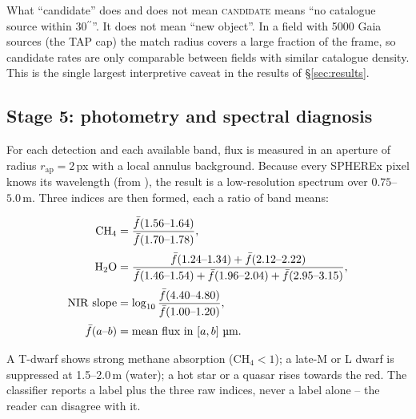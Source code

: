 \documentclass[11pt,a4paper]{article}
\newcommand{\arcsec}{\ensuremath{{}^{\prime\prime}}}
\newcommand{\code}[1]{\texttt{\small\detokenize{#1}}}
\begin{document}
\begin{warnbox}{What ``candidate'' does and does not mean}
\textsc{candidate} means ``no catalogue source within $30\arcsec$''. It does not mean ``new object''.
In a field with 5000 Gaia sources (the TAP cap) the match radius covers a large fraction of the frame,
so candidate rates are only comparable between fields with similar catalogue density. This is the
single largest interpretive caveat in the results of \S\ref{sec:results}.
\end{warnbox}

\subsection{Stage 5: photometry and spectral diagnosis}
\label{sec:spectrum}

For each detection and each available band, flux is measured in an aperture of radius
$r_{\mathrm{ap}} = 2$\,px with a local annulus background. Because every SPHEREx pixel knows its
wavelength (from \code{WCS-WAVE}), the result is a low-resolution spectrum over
$0.75$--$5.0$\,\textmu m. Three indices are then formed, each a ratio of band means:

\begin{align}
  \mathrm{CH_4} &= \frac{\bar f(1.56\text{--}1.64)} {\bar f(1.70\text{--}1.78)},
  \label{eq:ch4}\\[2pt]
  \mathrm{H_2O} &= \frac{\bar f(1.24\text{--}1.34)+\bar f(2.12\text{--}2.22)}
                          {\bar f(1.46\text{--}1.54)+\bar f(1.96\text{--}2.04)+\bar f(2.95\text{--}3.15)},
  \label{eq:h2o}\\[2pt]
  \mathrm{NIR\ slope} &= \log_{10}\frac{\bar f(4.40\text{--}4.80)}{\bar f(1.00\text{--}1.20)},
  \label{eq:slope}\\[2pt]
  \bar f(a\text{--}b) &= \text{mean flux in } [a,b]\ \text{\textmu m}.
  \label{eq:meanflux}
\end{align}

A T-dwarf shows strong methane absorption ($\mathrm{CH_4} < 1$); a late-M or L dwarf is suppressed at
1.5--2.0\,\textmu m (water); a hot star or a quasar rises towards the red. The classifier reports a
label plus the three raw indices, never a label alone -- the reader can disagree with it.
\end{document}
